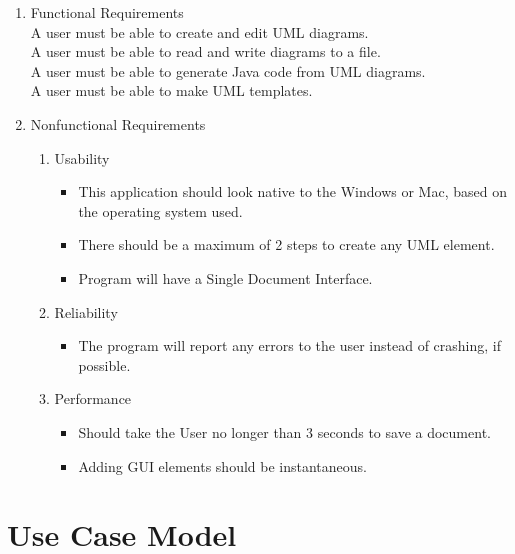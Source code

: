 \documentclass[a4paper, 12pt]{article}
\begin{document}
\begin{enumerate}
\item{Functional Requirements}\\
  A user must be able to create and edit UML diagrams.\\
  A user must be able to read and write diagrams to a file.\\
  A user must be able to generate Java code from UML diagrams.\\
  A user must be able to make UML templates.\\

\item{Nonfunctional Requirements}
  \begin{enumerate}
  \item{Usability}
    \begin {itemize}
      \item This application should look native to the Windows or Mac, based on the operating system used.
      \item There should be a maximum of 2 steps to create any UML element. 
      \item Program will have a Single Document Interface.
    \end {itemize}

  \item{Reliability}
    \begin {itemize}
      \item The program will report any errors to the user instead of crashing, if possible.
    \end {itemize}

  \item{Performance}
    \begin{itemize}
      \item Should take the User no longer than 3 seconds to save a document.
      \item Adding GUI elements should be instantaneous. %
    \end{itemize}
  \end{enumerate}
\end{enumerate}


\section{Use Case Model}
\end{document}

